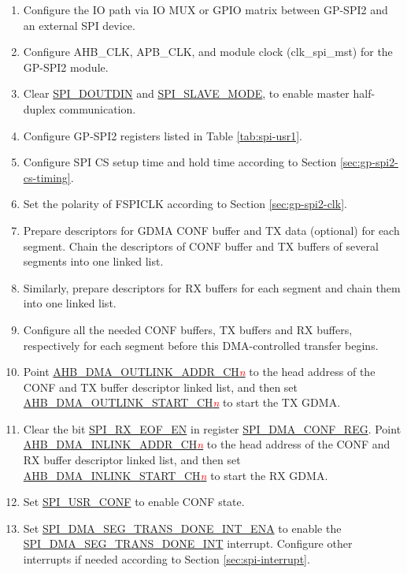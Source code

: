 \documentclass[main\_\_EN.tex]{subfiles}
\begin{document}
 \begin{enumerate}
    \item Configure the IO path via IO MUX or GPIO matrix between GP-SPI2 and an external SPI device. 
    \item Configure AHB\_CLK, APB\_CLK, and module clock (clk\_spi\_mst) for the GP-SPI2 module.
    \item Clear \hyperref[fielddesc:SPIDOUTDIN]{SPI\_DOUTDIN} and \hyperref[fielddesc:SPISLAVEMODE]{SPI\_SLAVE\_MODE}, to enable master half-duplex communication.
    \item Configure GP-SPI2 registers listed in Table \ref{tab:spi-usr1}.
    \item Configure SPI CS setup time and hold time according to Section \ref{sec:gp-spi2-cs-timing}.
    \item Set the polarity of FSPICLK according to Section \ref{sec:gp-spi2-clk}. 
   \item Prepare descriptors for GDMA CONF buffer and TX data (optional) for each segment. Chain the descriptors of CONF buffer and TX buffers of several segments into one linked list.
   \item Similarly, prepare descriptors for RX buffers for each segment and chain them into one linked list. 
   \item Configure all the needed CONF buffers, TX buffers and RX buffers, respectively for each segment before this DMA-controlled transfer begins.
   \item Point \hyperref[fielddesc:AHBDMAOUTLINKADDRCHN]{AHB\_DMA\_OUTLINK\_ADDR\_CH\textcolor{red}{\it{n}}} to the head address of the CONF and TX buffer descriptor linked list, and then set \hyperref[fielddesc:AHBDMAOUTLINKSTARTCHN]{AHB\_DMA\_OUTLINK\_START\_CH\textcolor{red}{\it{n}}} to start the TX GDMA. 
   \item Clear the bit \hyperref[fielddesc:SPIRXEOFEN]{SPI\_RX\_EOF\_EN} in register \hyperref[regdesc:SPIDMACONFREG]{SPI\_DMA\_CONF\_REG}. Point \hyperref[fielddesc:AHBDMAINLINKADDRCHN]{AHB\_DMA\_INLINK\_ADDR\_CH\textcolor{red}{\it{n}}} to the head address of the CONF and RX buffer descriptor linked list, and then set \hyperref[fielddesc:AHBDMAINLINKSTARTCHN]{AHB\_DMA\_INLINK\_START\_CH\textcolor{red}{\it{n}}} to start the RX GDMA. 
   \item Set \hyperref[fielddesc:SPIUSRCONF]{SPI\_USR\_CONF} to enable CONF state.
   \item Set \hyperref[fielddesc:SPIDMASEGTRANSDONEINTENA]{SPI\_DMA\_SEG\_TRANS\_DONE\_INT\_ENA} to enable the \hyperref[int:SPIDMASEGTRANSDONEINT]{SPI\_DMA\_SEG\_TRANS\_DONE\_INT} interrupt. Configure other interrupts if needed according to Section \ref{sec:spi-interrupt}. 


\end{enumerate}
\end{document}
